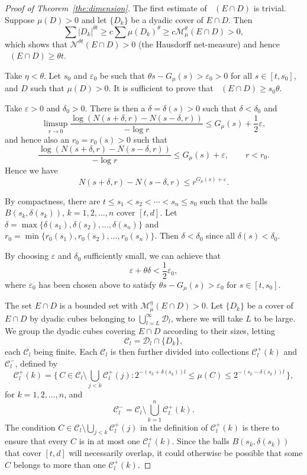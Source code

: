 \documentclass[AHL,Unicode,longabstracts]{cedram}
\DeclareMathOperator{\dimh}{dim_H}
\newcommand*{\dimh}{\mathrm{dim}_{\mathrm{H}}}
\begin{document}
\begin{proof}[Proof of Theorem~\ref{the:dimension}]
The first estimate of $\dimh (E \cap D)$ is trivial. Suppose $\mu (D) > 0$ and let $\{D_k\}$ be a dyadic cover of $E \cap D$. Then
\[
\sum |D_k|^{\theta t} \geq c \sum \mu (D_k)^\theta \geq c
\mathscr{M}_{\mu}^\theta (E \cap D) > 0,
\]
which shows that $\mathscr{N}^{\theta t} (E \cap D) > 0$ (the Hausdorff net-measure) and hence \linebreak$\dimh (E \cap D) \geq \theta t$.

Take $\eta < \theta$. Let $s_0$ and $\varepsilon_0$ be such that $\theta s - G_\mu (s) > \varepsilon_0 > 0$ for all $s \in [t,s_0]$, and $D$ such that $\mu (D) > 0$. It is sufficient to prove that $\dimh (E \cap D) \geq s_0 \theta$.

Take $\varepsilon > 0$ and $\delta_0 > 0$. There is then a $\delta =
\delta (s) > 0$ such that $\delta < \delta_0$ and
\[
\limsup_{r \to 0} \frac{\log (N(s+\delta, r) - N(s-\delta, r))}{-
\log r} \leq G_\mu (s) + \frac{1}{2} \varepsilon,
\]
and hence also an $r_0 = r_0 (s) > 0$ such that
\[
\frac{\log (N(s+\delta, r) - N(s-\delta, r))}{-
\log r} \leq G_\mu (s) + \varepsilon, \qquad r < r_0.
\]
Hence we have
\begin{equation}\label{eq:numberofcubes}
N(s+\delta, r) - N(s-\delta, r) \leq r^{G_\mu (s) + \varepsilon}.
\end{equation}

By compactness, there are $t \leq s_1 < s_2 < \cdots < s_n \leq s_0$ such that the balls $B(s_k, \delta(s_k))$, $k = 1, 2, \ldots, n$ cover $[t,d]$. Let $\delta = \max \{\delta (s_1), \delta(s_2),
\ldots, \delta(s_n)\}$ and $r_0 = \min \{r_0 (s_1), r_0(s_2),
\ldots, r_0(s_n)\}$. Then $\delta < \delta_0$ since all $\delta (s) < \delta_0$.

By choosing $\varepsilon$ and $\delta_0$ sufficiently small, we can achieve that
\[
\varepsilon + \theta \delta < \frac{1}{2} \varepsilon_0,
\]
where $\varepsilon_0$ has been chosen above to satisfy $\theta s - G_\mu (s) > \varepsilon_0$ for $s \in [t,s_0]$.

The set $E \cap D$ is a bounded set with $\mathscr{M}_\mu^\eta (E
\cap D) > 0$. Let $\{D_k\}$ be a cover of $E \cap D$ by dyadic cubes belonging to $\bigcup_{l = L}^\infty \mathscr{D}_l$, where we will take $L$ to be large. We group the dyadic cubes covering $E \cap D$ according to their sizes, letting
\[
\mathscr{C}_l = \mathscr{D}_l \cap \{D_k\},
\]
each $\mathscr{C}_l$ being finite. Each $\mathscr{C}_l$ is then further divided into collections $\mathscr{C}_l^+ (k)$ and $\mathscr{C}_l^-$, defined by
\[
\mathscr{C}_l^+ (k) = \biggl\{\, C \in \mathscr{C}_l \setminus
\bigcup_{j < k} \mathscr{C}_l^+ (j) : 2^{-(s_k+\delta (s_k))l} \leq
\mu (C) \leq 2^{-(s_k-\delta (s_k))l} \,\biggr\},
\]
for $k = 1,2,\ldots,n$, and
\[
\mathscr{C}_l^- = \mathscr{C}_l \setminus \bigcup_{k=1}^n
\mathscr{C}_l^+ (k).
\]
The condition $C \in \mathscr{C}_l \setminus \bigcup_{j < k}
\mathscr{C}_l^+ (j)$ in the definition of $\mathscr{C}_l^+ (k)$ is there to ensure that every $C$ is in at most one $\mathscr{C}_l^+ (k)$. Since the balls $B (s_k, \delta(s_k))$ that cover $[t,d]$ will necessarily overlap, it could otherwise be possible that some $C$ belongs to more than one $\mathscr{C}_l^+ (k)$.


\end{proof}
\end{document}
